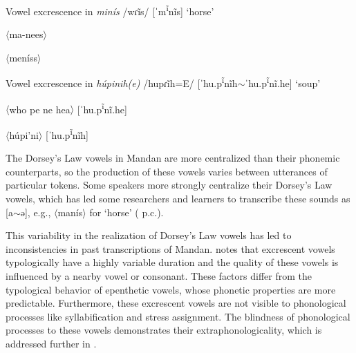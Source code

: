 \begin{exe}
\item\label{dorseyslaworthography1} Vowel excrescence in \textit{minís} /wɾĩs/ [ˈm\textsuperscript{ĩ}nĩs] `horse'

\begin{xlist}
	\item\label{dorseyslaworthography1a} $\langle$ma-nees$\rangle$ \citep[28]{benson2000}
	\item\label{dorseyslaworthography1b} $\langle$meníss$\rangle$ \citep[4]{littleowl1992}

\end{xlist}

\item\label{dorseyslaworthography2} Vowel excrescence in \textit{húpinih(e)} /hupɾĩh=E/ [ˈhu.p\textsuperscript{ĩ}nĩh$\sim$ˈhu.p\textsuperscript{ĩ}nĩ.he] `soup'
\begin{xlist}
	\item\label{dorseyslaworthography2a} $\langle$who pe ne hea$\rangle$ [ˈhu.p\textsuperscript{ĩ}nĩ.he] \citep[2]{benson1999}
	\item\label{dorseyslaworthography2b} $\langle$húpi'ni$\rangle$ [ˈhu.p\textsuperscript{ĩ}nĩh] \citep[23]{littleowl1992}

\end{xlist}

\end{exe}

The Dorsey's Law vowels in Mandan are more centralized than their phonemic counterparts, so the production of these vowels varies between utterances of particular tokens. Some speakers more strongly centralize their Dorsey's Law vowels, which has led some researchers and learners to transcribe these sounds as [a$\sim$ə], e.g.,  $\langle$manís$\rangle$ for `horse' (\citeauthor{park2012} p.c.).

This variability in the realization of Dorsey's Law vowels has led to inconsistencies in past transcriptions of Mandan. \citet[391]{hall2006} notes that excrescent vowels typologically have a highly variable duration and the quality of these vowels is influenced by a nearby vowel or consonant. These factors differ from the typological behavior of epenthetic vowels, whose phonetic properties are more predictable. Furthermore, these excrescent vowels are not visible to phonological processes like syllabification and stress assignment. The blindness of phonological processes to these vowels demonstrates their extraphonologicality, which is addressed further in .


